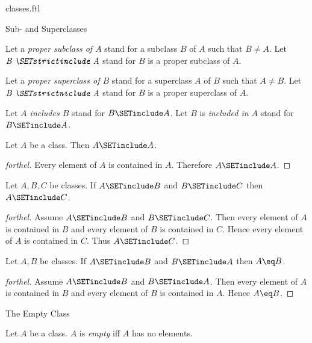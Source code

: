 \documentclass{stex}
\begin{document}
\begin{smodule}{classes.ftl}
\begin{sfragment}{Sub- and Superclasses}
\begin{definition}[forthel,id=FOUNDATIONS_01_3275578358628352]
    Let a \emph{proper subclass of $A$} stand for a subclass $B$ of $A$ such that $B \neq A$.
    Let $\emph{B \SETstrictinclude A}$ stand for $B$ is a proper subclass of $A$.

    Let a \emph{proper superclass of $B$} stand for a superclass $A$ of $B$ such that $A \neq B$.
    Let $\emph{B \SETstrictniclude A}$ stand for $B$ is a proper superclass of $A$.

    Let \emph{$A$ includes $B$} stand for $B \SETinclude A$.
    Let $B$ is \emph{included in $A$} stand for $B \SETinclude A$.
  \end{definition}

  \begin{proposition}[forthel,id=FOUNDATIONS_01_5994555614691328]
    Let $A$ be a class.
    Then $A \SETinclude A$.
  \end{proposition}
  \begin{proof}[forthel]
    Every element of $A$ is contained in $A$.
    Therefore $A \SETinclude A$.
  \end{proof}

  \begin{proposition}[forthel,id=FOUNDATIONS_01_3939677545431040]
    Let $A, B, C$ be classes.
    If $A \SETinclude B$ and $B \SETinclude C$ then $A \SETinclude C$.
  \end{proposition}
  \begin{proof}[forthel]
    Assume $A \SETinclude B$ and $B \SETinclude C$.
    Then every element of $A$ is contained in $B$ and every element of $B$ is contained in $C$.
    Hence every element of $A$ is contained in $C$.
    Thus $A \SETinclude C$.
  \end{proof}

  \begin{proposition}[forthel,id=FOUNDATIONS_01_7159957847801856]
    Let $A, B$ be classes.
    If $A \SETinclude B$ and $B \SETinclude A$ then $A \eq B$.
  \end{proposition}
  \begin{proof}[forthel]
    Assume $A \SETinclude B$ and $B \SETinclude A$.
    Then every element of $A$ is contained in $B$ and every element of $B$ is contained in $A$.
    Hence $A \eq B$.
  \end{proof}
\end{sfragment}

\begin{sfragment}{The Empty Class}
  \begin{definition}[forthel,id=FOUNDATIONS_01_6252477624090624]
    Let $A$ be a class.
    $A$ is \emph{empty} iff $A$ has no elements.


\end{definition}
\end{sfragment}
\end{smodule}
\end{document}
